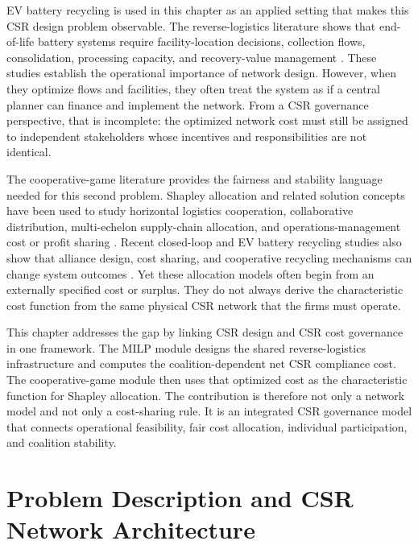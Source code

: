 EV battery recycling is used in this chapter as an applied setting that makes this CSR design problem observable. The reverse-logistics literature shows that end-of-life battery systems require facility-location decisions, collection flows, consolidation, processing capacity, and recovery-value management \cite{tadaros2022location,bafadal2024proposed,wang2025planning,ma2024unlocking}. These studies establish the operational importance of network design. However, when they optimize flows and facilities, they often treat the system as if a central planner can finance and implement the network. From a CSR governance perspective, that is incomplete: the optimized network cost must still be assigned to independent stakeholders whose incentives and responsibilities are not identical.

The cooperative-game literature provides the fairness and stability language needed for this second problem. Shapley allocation and related solution concepts have been used to study horizontal logistics cooperation, collaborative distribution, multi-echelon supply-chain allocation, and operations-management cost or profit sharing \cite{lozano2013cooperative,wang2023collaborative,meng2023profit,luo2022core}. Recent closed-loop and EV battery recycling studies also show that alliance design, cost sharing, and cooperative recycling mechanisms can change system outcomes \cite{ZhengB2022,Xiao2024}. Yet these allocation models often begin from an externally specified cost or surplus. They do not always derive the characteristic cost function from the same physical CSR network that the firms must operate.

This chapter addresses the gap by linking CSR design and CSR cost governance in one framework. The MILP module designs the shared reverse-logistics infrastructure and computes the coalition-dependent net CSR compliance cost. The cooperative-game module then uses that optimized cost as the characteristic function for Shapley allocation. The contribution is therefore not only a network model and not only a cost-sharing rule. It is an integrated CSR governance model that connects operational feasibility, fair cost allocation, individual participation, and coalition stability.

\section{Problem Description and CSR Network Architecture}
\label{sec:problem_desc}

